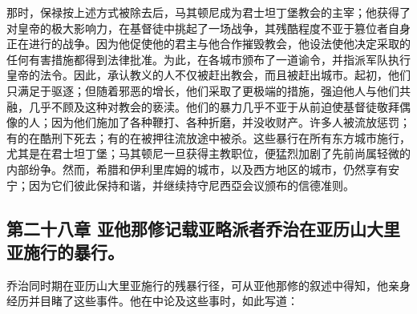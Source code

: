 那时，保禄按上述方式被除去后，马其顿尼成为君士坦丁堡教会的主宰；他获得了对皇帝的极大影响力，在基督徒中挑起了一场战争，其残酷程度不亚于篡位者自身正在进行的战争。因为他促使他的君主与他合作摧毁教会，他设法使他决定采取的任何有害措施都得到法律批准。为此，在各城市颁布了一道谕令，并指派军队执行皇帝的法令。因此，承认教义的人不仅被赶出教会，而且被赶出城市。起初，他们只满足于驱逐；但随着邪恶的增长，他们采取了更极端的措施，强迫他人与他们共融，几乎不顾及这种对教会的亵渎。他们的暴力几乎不亚于从前迫使基督徒敬拜偶像的人；因为他们施加了各种鞭打、各种折磨，并没收财产。许多人被流放惩罚；有的在酷刑下死去；有的在被押往流放途中被杀。这些暴行在所有东方城市施行，尤其是在君士坦丁堡；马其顿尼一旦获得主教职位，便猛烈加剧了先前尚属轻微的内部纷争。然而，希腊和伊利里库姆的城市，以及西方地区的城市，仍然享有安宁；因为它们彼此保持和谐，并继续持守尼西亞会议颁布的信德准则。\par


\subsection{第二十八章 亚他那修记载亚略派者乔治在亚历山大里亚施行的暴行。}

乔治同时期在亚历山大里亚施行的残暴行径，可从亚他那修的叙述中得知，他亲身经历并目睹了这些事件。他在中论及这些事时，如此写道：\par

